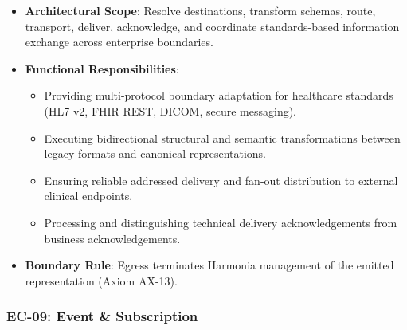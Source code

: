 \begin{itemize}

\item 
\textbf{Architectural Scope}: Resolve destinations, transform schemas, route, transport, deliver, acknowledge, and coordinate standards-based information exchange across enterprise boundaries.



\item 
\textbf{Functional Responsibilities}:


\begin{itemize}

\item 
Providing multi-protocol boundary adaptation for healthcare standards (HL7 v2, FHIR REST, DICOM, secure messaging).



\item 
Executing bidirectional structural and semantic transformations between legacy formats and canonical representations.



\item 
Ensuring reliable addressed delivery and fan-out distribution to external clinical endpoints.



\item 
Processing and distinguishing technical delivery acknowledgements from business acknowledgements.



\end{itemize}


\item 
\textbf{Boundary Rule}: Egress terminates Harmonia management of the emitted representation (Axiom AX-13).



\end{itemize}
\label{rad:enterprise:175}
\subsubsection*{EC-09: Event \& Subscription}
\label{rad:enterprise:176}

